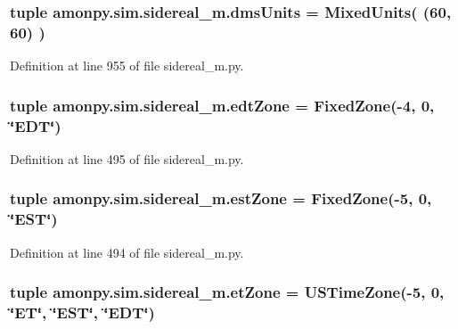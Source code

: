 \hypertarget{namespaceamonpy_1_1sim_1_1sidereal__m_a76e1c6a5ad60ea1da2d1b2077ec8941c}{
\subsubsection[{dms\-Units}]{\setlength{\rightskip}{0pt plus 5cm}tuple amonpy.\-sim.\-sidereal\-\_\-m.\-dms\-Units = {\bf Mixed\-Units}( (60, 60) )}}\label{namespaceamonpy_1_1sim_1_1sidereal__m_a76e1c6a5ad60ea1da2d1b2077ec8941c}


Definition at line 955 of file sidereal\-\_\-m.\-py.

\hypertarget{namespaceamonpy_1_1sim_1_1sidereal__m_acab72e465649c98de2d76ea74d7f9b15}{
\subsubsection[{edt\-Zone}]{\setlength{\rightskip}{0pt plus 5cm}tuple amonpy.\-sim.\-sidereal\-\_\-m.\-edt\-Zone = {\bf Fixed\-Zone}(-\/4, 0, \char`\"{}E\-D\-T\char`\"{})}}\label{namespaceamonpy_1_1sim_1_1sidereal__m_acab72e465649c98de2d76ea74d7f9b15}


Definition at line 495 of file sidereal\-\_\-m.\-py.

\hypertarget{namespaceamonpy_1_1sim_1_1sidereal__m_ad4ecd1f85cd34046df5d51b69693c7d3}{
\subsubsection[{est\-Zone}]{\setlength{\rightskip}{0pt plus 5cm}tuple amonpy.\-sim.\-sidereal\-\_\-m.\-est\-Zone = {\bf Fixed\-Zone}(-\/5, 0, \char`\"{}E\-S\-T\char`\"{})}}\label{namespaceamonpy_1_1sim_1_1sidereal__m_ad4ecd1f85cd34046df5d51b69693c7d3}


Definition at line 494 of file sidereal\-\_\-m.\-py.

\hypertarget{namespaceamonpy_1_1sim_1_1sidereal__m_a707d78fbaf9888c75c4e5db1ff8b49eb}{
\subsubsection[{et\-Zone}]{\setlength{\rightskip}{0pt plus 5cm}tuple amonpy.\-sim.\-sidereal\-\_\-m.\-et\-Zone = {\bf U\-S\-Time\-Zone}(-\/5, 0, \char`\"{}E\-T\char`\"{}, \char`\"{}E\-S\-T\char`\"{}, \char`\"{}E\-D\-T\char`\"{})}}\label{namespaceamonpy_1_1sim_1_1sidereal__m_a707d78fbaf9888c75c4e5db1ff8b49eb}


